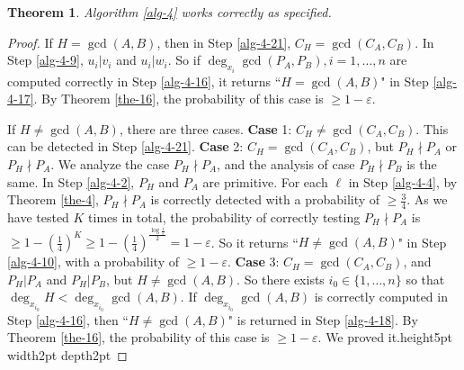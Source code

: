 \documentclass[final,20pt]{elsarticle}
\newtheorem{theorem}{Theorem}[section]
\def\qed{\hfil {\vrule height5pt width2pt depth2pt}}
\begin{document}
\begin{theorem}
Algorithm \ref{alg-4} works correctly as specified.
\end{theorem}
\begin{proof}
If $H=\gcd(A,B)$, then in Step \ref{alg-4-21}, $C_{H}=\gcd(C_A,C_B)$. In Step \ref{alg-4-9}, $u_i|v_i$ and $u_i|w_i$. So if $\deg_{x_i}\gcd(P_A,P_B),i=1,\dots,n$ are computed correctly in Step \ref{alg-4-16}, it returns ``$H=\gcd(A,B)$" in Step \ref{alg-4-17}. By Theorem \ref{the-16}, the probability of this case is $\geq 1-\varepsilon$.

If $H\neq \gcd(A,B)$, there are three cases.
{\bf Case} 1: $C_{H}\neq \gcd(C_A,C_B)$. This can be detected in Step \ref{alg-4-21}.
%
{\bf Case} 2: $C_{H}=\gcd(C_A,C_B)$, but $P_{H}\nmid P_A$ or $P_{H}\nmid P_A$. We analyze the case $P_{H}\nmid P_A$, and the analysis of case $P_{H}\nmid P_B$ is the same.
%
In Step \ref{alg-4-2}, $P_{H}$ and $P_A$ are primitive.
%
For each $\ell$ in Step \ref{alg-4-4}, by Theorem \ref{the-4}, $P_{H}\nmid P_A$ is correctly detected with a probability of $\geq \frac34$. As we have tested $K$ times in total, the probability of correctly testing  $P_{H}\nmid P_A$ is $\geq 1-(\frac14)^K\geq 1-(\frac14)^{\frac{\log \frac{1}{\varepsilon}}{2}}=1-\varepsilon$. So it returns ``$H\neq \gcd(A,B)$" in Step \ref{alg-4-10}, with a probability of $\geq 1-\varepsilon$.
%
{\bf Case} 3: $C_{H}=\gcd(C_A,C_B)$, and $P_{H}| P_A$ and $P_{H}| P_B$, but $H\neq \gcd(A,B)$. So there exists $i_0\in \{1,\dots,n\}$ so that $\deg_{x_{i_0}}{H}<\deg_{x_{i_0}}\gcd(A,B)$.
%
If $\deg_{x_{i_0}}\gcd(A,B)$ is correctly computed in Step \ref{alg-4-16}, then ``$H\neq \gcd(A,B)$" is returned in Step \ref{alg-4-18}. By  Theorem \ref{the-16}, the probability of this case is $\geq 1-\varepsilon$.
%
We proved it.\qed
\end{proof}
\end{document}
